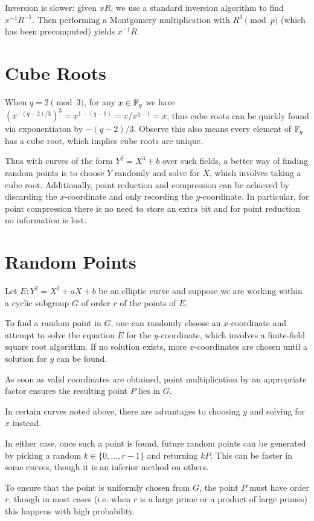 Inversion is slower: given $xR$, we use a standard inversion algorithm
to find $x^{-1}R^{-1}$. Then performing a Montgomery multiplication with
$R^3 \pmod p$ (which has been precomputed) yields $x^{-1}R$.

\section{Cube Roots}

When $q = 2 \pmod 3$, for any $x \in \mathbb{F}_q$ we have
$(x^{-(q-2)/3})^3 = x^{1-(q-1)} = x / x^{q-1} = x$,
thus cube roots can be quickly found via exponentiaton
by $-(q-2)/3$. Observe this also means every element of $\mathbb{F}_q$ has
a cube root, which implies cube roots are unique.

Thus with curves of the form $Y^2 = X^3 + b$ over such fields,
a better way of finding random points is to choose $Y$ randomly and
solve for $X$, which involves taking a cube root. Additionally,
point reduction and compression can be achieved by discarding the
$x$-coordinate and only recording the $y$-coordinate. In particular,
for point compression there is no need to store an extra bit and
for point reduction no information is lost.

\section{Random Points}

Let $E : Y^2 = X^3 + a X + b$ be an elliptic curve and suppose we
are working within a cyclic subgroup $G$ of order $r$
of the points of $E$.

To find a random point in $G$, one can randomly choose an $x$-coordinate and
attempt to solve the equation $E$ for the $y$-coordinate, which involves
a finite-field square root algorithm. If no solution exists, more
$x$-coordinates are chosen until a solution for $y$ can be found.

As soon as valid coordinates are obtained,
point multiplication by an appropriate
factor ensures the resulting point $P$ lies in $G$.

In certain curves noted above, there are advantages to choosing $y$ and
solving for $x$ instead.

In either case,
once such a point is found, future random points can be generated by
picking a random $k \in \{0,...,r-1\}$ and returning $kP$. This
can be faster in some curves, though it is an inferior method on others.

To ensure that the point is uniformly chosen from $G$, the point
$P$ must have order $r$, though in most cases (i.e. when $r$ is a large prime
or a product of large primes) this happens with high probability.


